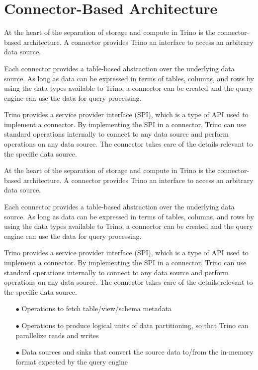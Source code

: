 \section{Connector-Based Architecture}
At the heart of the separation of storage and compute in Trino is the connector-based architecture. A connector provides Trino an interface to access an arbitrary data source.

Each connector provides a table-based abstraction over the underlying data source. As long as data can be expressed in terms of tables, columns, and rows by using the data types available to Trino, a connector can be created and the query engine can use the data for query processing.

Trino provides a service provider interface (SPI), which is a type of API used to implement a connector. By implementing the SPI in a connector, Trino can use standard operations internally to connect to any data source and perform operations on any data source. The connector takes care of the details relevant to the specific data source.

At the heart of the separation of storage and compute in Trino is the connector-based architecture. A connector provides Trino an interface to access an arbitrary data source.

Each connector provides a table-based abstraction over the underlying data source. As long as data can be expressed in terms of tables, columns, and rows by using the data types available to Trino, a connector can be created and the query engine can use the data for query processing.

Trino provides a service provider interface (SPI), which is a type of API used to implement a connector. By implementing the SPI in a connector, Trino can use standard operations internally to connect to any data source and perform operations on any data source. The connector takes care of the details relevant to the specific data source.
\begin{enumerate}
	\item[$\bullet$] Operations to fetch table/view/schema metadata
	\item[$\bullet$] Operations to produce logical units of data partitioning, so that Trino can parallelize reads and writes
	\item[$\bullet$] Data sources and sinks that convert the source data to/from the in-memory format expected by the query engine 
\end{enumerate}

